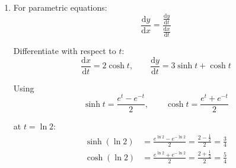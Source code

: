 \documentclass[leqno]{article}
\begin{document}
\begin{enumerate}[
  label=\textbf{\arabic*.},
  leftmargin=*,
  topsep=0pt,
  partopsep=0pt,
  parsep=0pt
]
\begin{djsSolution}
\begin{enumerate}[label=\textbf{(\alph*)}]
\begin{enumerate}[label=(\roman*)]
    Hence
    \[
    \sinh t=-\frac12
    \]

    Using the logarithmic form of the inverse hyperbolic sine:
    \[
    \operatorname{arsinh} u=\ln\left(u+\sqrt{u^2+1}\right)
    \]

    gives
    \begin{align*}
    t&=\operatorname{arsinh}\left(-\frac12\right)\\
    &=\ln\left(-\frac12+\sqrt{\frac14+1}\right)\\
    &=\ln\left(-\frac12+\frac{\sqrt5}{2}\right)\\
    &=\ln\left(\frac{\sqrt5-1}{2}\right)
    \end{align*}

    \item From part (i), $\sinh t=-\frac12$. Using the identity
    \[
    \cosh^2 t-\sinh^2 t=1
    \]

    we get
    \begin{align*}
    \cosh^2 t-\left(-\frac12\right)^2&=1\\
    \cosh^2 t&=1+\frac14=\frac54
    \end{align*}

    Since $\cosh t>0$, we have
    \[
    \cosh t=\frac{\sqrt5}{2}
    \]

    Now
    \begin{align*}
    y&=3\cosh t+\sinh t\\
    &=3\left(\frac{\sqrt5}{2}\right)-\frac12\\
    &=\frac{3\sqrt5-1}{2}
    \end{align*}

    Hence
    \[
    y=\frac{3\sqrt5-1}{2}\approx 2.85\qquad\text{(3 s.f.)}
    \]
  \end{enumerate}

  \item For parametric equations:
  \[
  \frac{\mathrm{d}y}{\mathrm{d}x}=\frac{\frac{\mathrm{d}y}{\mathrm{d}t}}{\frac{\mathrm{d}x}{\mathrm{d}t}}
  \]

  Differentiate with respect to $t$:
  \[
  \frac{\mathrm{d}x}{\mathrm{d}t}=2\cosh t,\qquad \frac{\mathrm{d}y}{\mathrm{d}t}=3\sinh t+\cosh t
  \]

  Using
  \[
  \sinh t=\frac{e^t-e^{-t}}{2},\qquad \cosh t=\frac{e^t+e^{-t}}{2}
  \]

  at $t=\ln 2$:
  \begin{align*}
  \sinh(\ln 2)&=\frac{e^{\ln 2}-e^{-\ln 2}}{2}
  =\frac{2-\frac12}{2}
  =\frac34\\
  \cosh(\ln 2)&=\frac{e^{\ln 2}+e^{-\ln 2}}{2}
  =\frac{2+\frac12}{2}
  =\frac54
  \end{align*}


\end{enumerate}
\end{djsSolution}
\end{enumerate}
\end{document}
